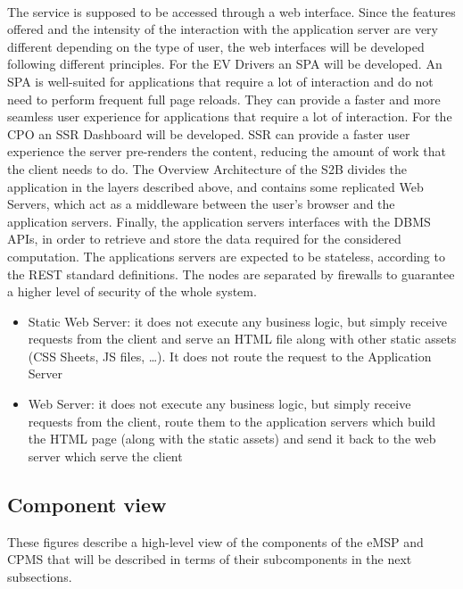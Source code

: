 \hfill \\
The service is supposed to be accessed through a web interface.
Since the features offered and the intensity of the interaction with the application server
are very different depending on the type of user, the web interfaces will be developed following
different principles.
For the EV Drivers an SPA will be developed. An SPA is well-suited for applications
that require a lot of interaction and do not need to perform frequent full page reloads.
They can provide a faster and more seamless user experience for applications that require a
lot of interaction.
For the CPO an SSR Dashboard will be developed. SSR can provide a faster user experience
the server pre-renders the content, reducing the amount of work that the client needs to do.
The Overview Architecture of the S2B divides the application in the layers described
above, and contains some replicated Web Servers, which act as a middleware
between the user's browser and the application servers.
Finally, the application servers interfaces with the DBMS APIs, in order
to retrieve and store the data required for the considered computation.
The applications servers are expected to be stateless, according to the
REST standard definitions. The nodes are separated by firewalls to guarantee a higher level of security
of the whole system.

\begin{itemize}
    \item Static Web Server: it does not execute any business logic, but simply receive requests from the client and serve an HTML file along with other static assets (CSS Sheets, JS files, \dots).
          It does not route the request to the Application Server
    \item Web Server: it does not execute any business logic, but simply receive requests from the client, route
          them to the application servers which build the HTML page (along with the static assets) and send it back to the web server which serve the client
\end{itemize}
\pagebreak
\subsection{Component view}
These figures describe a high-level view of the components of the eMSP and CPMS that will be described in terms of their subcomponents in the next subsections.

